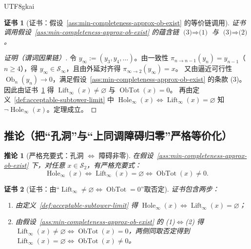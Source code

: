 \documentclass[12pt]{article}
\newtheorem{corollary}{推论}[section]
\newtheorem{Certificate}{证书}[section]
\newcommand{\Ob}{\operatorname{Ob}}
\newcommand{\ObTot}{\operatorname{ObTot}}
\newcommand{\Hole}{\operatorname{Hole}}
\newcommand{\Lift}{\operatorname{Lift}}
\begin{document}
\begin{CJK*}{UTF8}{gkai}
\begin{Certificate}[证书：假设~\ref{ass:min-completeness-approx-ob-exist} 的等价链调用]\label{cert:strict-no-hole-lift-from-approx}
证书调用假设~\ref{ass:min-completeness-approx-ob-exist} 的蕴含链
\(
\text{(3)}\Rightarrow\text{(1)}
\)
与
\(
\text{(3)}\Rightarrow\text{(2)}
\)。
\end{Certificate}

\begin{proof}[证明（谓词因果链）]
令 $y_\infty:=(y_3,y_4,\dots)$。由一致性 $\pi_{n\to n-1}(y_n)=y_{n-1}$（$n\ge4$），得 $y_\infty\in\mathcal S_\infty$，且由外延对齐得
  $\pi_{\infty\to2}(y_\infty)=x$。
又由逼近可行性 $\Ob_n(y_n)\to 0$，满足假设~\ref{ass:min-completeness-approx-ob-exist} 的条款 (3)。
因此由证书~\ref{cert:strict-no-hole-lift-from-approx} 得
\(
\Lift_\infty(x)\neq\varnothing
\)
与
\(
\ObTot(x)=0
\)。
再由定义~\ref{def:acceptable-subtower-limit} 中
\(
\Hole_\infty(x)\Longleftrightarrow \Lift_\infty(x)=\varnothing
\)
知 $\neg \Hole_\infty(x)$。定理成立。
\end{proof}

\subsection{推论（把“孔洞”与“上同调障碍归零”严格等价化）}

\begin{corollary}[严格充要式：孔洞 $\Leftrightarrow$ 障碍非零]\label{cor:hole-iff-obtot-strict}
在假设~\ref{ass:min-completeness-approx-ob-exist} 下，对任意 $x\in\mathcal S_2$，有严格充要式：
\[
\Hole_\infty(x)
\Longleftrightarrow
\Lift_\infty(x)=\varnothing
\Longleftrightarrow
\ObTot(x)\neq 0.
\]
\end{corollary}

\begin{Certificate}[证书：由“$\Lift_\infty\neq\varnothing \Longleftrightarrow \ObTot=0$”取否定]\label{cert:hole-iff-obtot-strict}
证书包含两步：
\begin{enumerate}
\item 由定义~\ref{def:acceptable-subtower-limit} 得 $\Hole_\infty(x)\Longleftrightarrow \Lift_\infty(x)=\varnothing$；
\item 由假设~\ref{ass:min-completeness-approx-ob-exist} 的 (1)$\Longleftrightarrow$(2) 得 $\Lift_\infty(x)
  \neq\varnothing\Longleftrightarrow \ObTot(x)=0$，两侧同取否定得到 $\Lift_\infty(x)=\varnothing\Longleftrightarrow \ObTot(x)\neq
  0$。
\end{enumerate}
\end{Certificate}


\end{CJK*}
\end{document}
